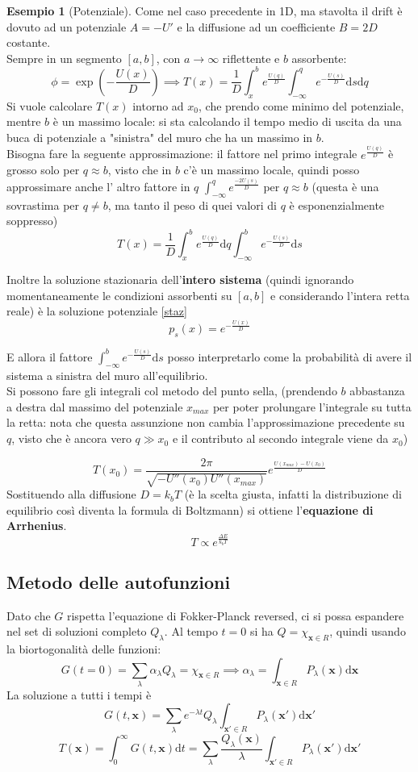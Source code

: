 \documentclass[a4paper,12pt]{article}
\theoremstyle{plain}
\renewcommand{\vec}[1]{{\boldsymbol{#1}}}
\theoremstyle{definition}
\newtheorem{exmp}{Esempio}[section]
\newcommand{\f}[2]{\frac{#1}{#2}}
\renewcommand{\d}{\text{d}}
\newcommand{\pos}{\vec{x}}
\newcommand{\tem}{k_b T }
\newcommand{\ra}{\rightarrow}
\theoremstyle{remark}
\begin{document}
\begin{exmp}[Potenziale]
	Come nel caso precedente in 1D, ma stavolta il drift è dovuto ad un potenziale $A=-U'$ e la diffusione ad un coefficiente $B=2D$ costante. \\Sempre in un segmento $[a,b]$, con $a\ra \infty$ riflettente e $b$ assorbente:
	\[\phi=\exp(-\f{U(x)}{D})\implies T(x)=\f{1}{D}\int_x^b	e^{	\f{ U(q)}{D}}\int_{-\infty}^q 	e^{-\f{ U(s)}{D}}	\d s	\d q		\]
	Si vuole calcolare $T(x)$ intorno  ad $x_0$, che prendo come minimo del potenziale, mentre $b$ è un massimo locale: si sta calcolando il tempo medio di uscita da una buca di potenziale a "sinistra" del muro che ha un massimo in $b$.\\Bisogna fare la seguente approssimazione: il fattore nel primo integrale 	$e^{\f{U(q)}{D}}$ è grosso solo per $q\approx b$, visto che in $b$ c'è un massimo locale, quindi posso approssimare anche l' altro fattore in $q$  $\int_{-\infty}^q e^{\f{-2U(s)}{D}}$ per $q\approx b$ (questa è una sovrastima per $q\ne b$, ma tanto il peso di quei valori di $q$ è esponenzialmente soppresso) 
	\[T(x)=\f{1}{D}\int_x^b e^{\f{U(q)}{D}}\d q\int_{-\infty}^b e^{-\f{U(s)}{D}}\d s\]
		
Inoltre la soluzione stazionaria dell'\textbf{intero sistema} (quindi ignorando momentaneamente le condizioni assorbenti su $[a,b]$ e considerando l'intera retta reale) è la soluzione potenziale \ref{staz}
\[p_s(x)=e^{-\f{U(x)}{D}}\]

E allora il fattore $\int_{-\infty}^b e^{-\f{U(s)}{D}}\d s  $
posso interpretarlo come la probabilità di avere il sistema a sinistra del muro all'equilibrio.\\Si possono fare gli integrali col metodo del punto sella, (prendendo $b$ abbastanza a destra dal massimo del potenziale $x_{max}$ per poter prolungare l'integrale su tutta la retta: nota che questa assunzione non cambia l'approssimazione precedente su $q$, visto che è ancora vero $q\gg x_0$ e il contributo al secondo integrale viene da $x_0$)


\[T(x_0)=	\f{2\pi}{\sqrt{-U''(x_0) U''(x_{max})}}	 e^{\f{U(x_{max})-U(x_0)}{D}}\]
Sostituendo alla diffusione $D=\tem$ (è la scelta giusta, infatti la distribuzione di equilibrio così diventa la formula di Boltzmann) si ottiene l'\textbf{equazione di Arrhenius}.
\[T\propto e^{\f{\Delta E}{\tem}}\]

\end{exmp}
\subsection{Metodo delle autofunzioni}
Dato che $G$ rispetta l'equazione di Fokker-Planck reversed, ci si possa 
espandere nel set di soluzioni completo $Q_\lambda$. Al tempo $t=0$ si ha $Q=\chi_{\pos \in R}$, quindi usando la  biortogonalità delle funzioni:
\[G(t=0)=\sum_{\lambda}  \alpha_\lambda Q_\lambda=\chi_{\pos \in R}\implies \alpha_\lambda=\int_{\pos\in R}	P_\lambda (\pos)\d\pos	\]
La soluzione a tutti i tempi è 
\[G(t,\pos)= \sum_{\lambda }e^{-\lambda t}  Q_\lambda\int_{\pos'\in R}	P_\lambda (\pos')\d\pos'\]
\[T(\pos)=\int_0^\infty G(t,\pos)\d t=\sum_{\lambda}	  \f{Q_\lambda(\pos)}{\lambda}\int_{\pos'\in R}	P_\lambda (\pos')\d\pos'		\]
\end{document}
